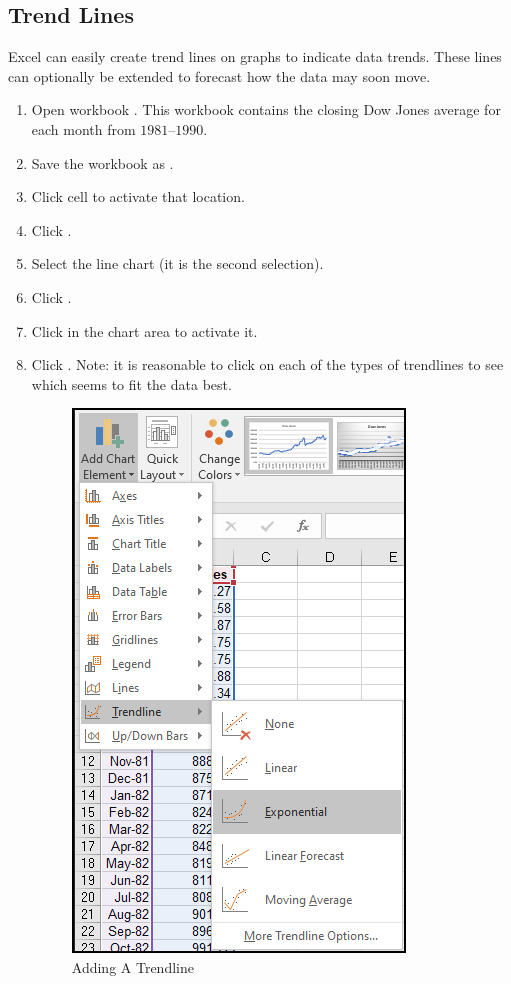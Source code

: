 \subsection{Trend Lines}

Excel can easily create trend lines on graphs to indicate data trends. These lines can optionally be extended to forecast how the data may soon move.

\begin{enumerate}
	\item Open workbook . This workbook contains the closing Dow Jones average for each month from $ 1981 $–$ 1990 $.
	\item Save the workbook as .
	\item Click cell  to activate that location.
	\item Click .
	\item Select the line chart (it is the second selection).
	\item Click .
	\item Click in the chart area to activate it.
	\item Click . Note: it is reasonable to click on each of the types of trendlines to see which seems to fit the data best.

	\begin{figure}[H]
		\centering
		\includegraphics[width=\maxwidth{.50\linewidth}]{gfx/ch08_fig07}
		\caption{Adding A Trendline}
		\label{08:fig07}
	\end{figure}


\end{enumerate}
